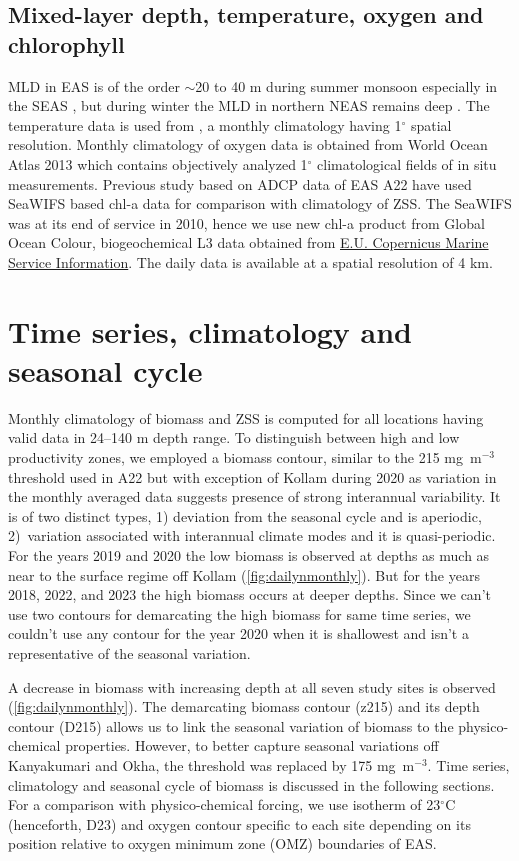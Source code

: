 \documentclass[authoryear,review,12pt]{elsarticle}
\begin{document}
	\subsection{Mixed-layer depth, temperature, oxygen and chlorophyll}
	MLD in EAS is of the order $\sim$20 to 40 m during summer monsoon \citep{shetye1990hydrography,shankar2002hydrography,sreenivas2008monthly} especially in the SEAS \citep{shenoi2005hydrography}, but during winter the MLD in northern NEAS remains deep \citep{shankar2016inhibition}. The temperature data is used from \citet{chatterjee2012new}, a monthly climatology having 1$^{\circ}$ spatial resolution. Monthly climatology of oxygen data is obtained from World Ocean Atlas 2013 \citep{garcia2013oxygen} which contains objectively analyzed 1$^{\circ}$ climatological fields of in situ measurements. Previous study based on ADCP data of EAS A22 have used SeaWIFS based chl-a data for comparison with climatology of ZSS. The SeaWIFS was at its end of service in 2010, hence we use new chl-a product from Global Ocean Colour, biogeochemical L3 data obtained from  \href{https://doi.org/10.48670/moi-00280}{E.U. Copernicus Marine Service Information}. The daily data is available at a spatial resolution of 4 km. 
	
	\section{Time series, climatology and seasonal cycle}
	Monthly climatology of biomass and ZSS is computed for all locations having valid data in 24--140 m depth range. To distinguish between high and low productivity zones, we employed a biomass contour, similar to the 215 mg~m$^{-3}$ threshold used in A22 but with exception of Kollam during 2020 as variation in the monthly averaged data suggests presence of strong interannual variability. It is of two distinct types, 1) deviation from the seasonal cycle and is aperiodic, 2)~variation associated with interannual climate modes and it is quasi-periodic. For the years 2019 and 2020 the low biomass is observed at depths as much as near to the surface regime off Kollam (\cref{fig:dailynmonthly}). But for the years 2018, 2022, and 2023 the high biomass occurs at deeper depths. Since we can't use  two contours for demarcating the high biomass for same time series, we couldn't use any contour for the year 2020 when it is shallowest and isn't a representative of the seasonal variation. 
	
	A decrease in biomass with increasing depth at all seven study sites is observed (\cref{fig:dailynmonthly}). The demarcating biomass contour (z215) and its depth contour (D215) allows us to link the seasonal variation of biomass to the physico-chemical properties. However, to better capture seasonal variations off Kanyakumari and Okha, the threshold was replaced by 175 mg~m$^{-3}$. Time series, climatology and seasonal cycle of biomass is discussed in the following sections. For a comparison with physico-chemical forcing, we use isotherm of 23$^{\circ}$C (henceforth, D23) and oxygen contour specific to each site depending on its position relative to oxygen minimum zone (OMZ) boundaries of EAS. 
	
\end{document}
